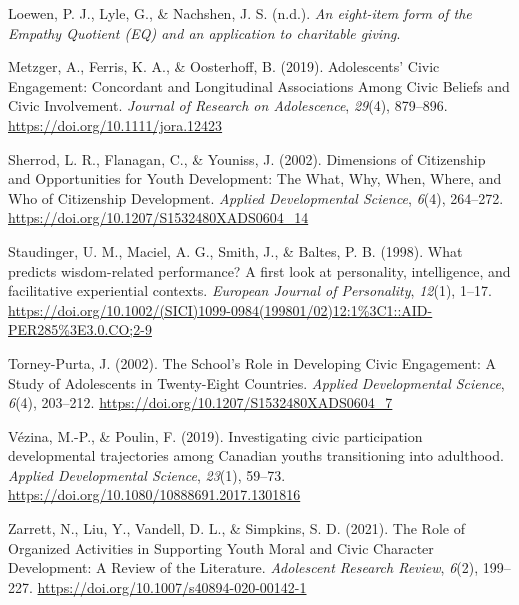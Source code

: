 \documentclass[
  man,
  floatsintext,
  longtable,
  nolmodern,
  notxfonts,
  notimes,
  colorlinks=true,linkcolor=blue,citecolor=blue,urlcolor=blue]{apa7}
\newlength{\cslhangindent}
\newenvironment{CSLReferences}[2] %
 {\begin{list}{}{%
  \setlength{\itemindent}{0pt}
  \setlength{\leftmargin}{0pt}
  \setlength{\parsep}{0pt}
  \ifodd #1
   \setlength{\leftmargin}{\cslhangindent}
   \setlength{\itemindent}{-1\cslhangindent}
  \fi
  \setlength{\itemsep}{#2\baselineskip}}}
 {\end{list}}
\begin{document}
\begin{CSLReferences}{1}{0}
Loewen, P. J., Lyle, G., \& Nachshen, J. S. (n.d.). \emph{An eight-item
form of the {Empathy Quotient} ({EQ}) and an application to charitable
giving}.

Metzger, A., Ferris, K. A., \& Oosterhoff, B. (2019). Adolescents'
{Civic Engagement}: {Concordant} and {Longitudinal Associations Among
Civic Beliefs} and {Civic Involvement}. \emph{Journal of Research on
Adolescence}, \emph{29}(4), 879--896.
\url{https://doi.org/10.1111/jora.12423}

Sherrod, L. R., Flanagan, C., \& Youniss, J. (2002). Dimensions of
{Citizenship} and {Opportunities} for {Youth Development}: {The What},
{Why}, {When}, {Where}, and {Who} of {Citizenship Development}.
\emph{Applied Developmental Science}, \emph{6}(4), 264--272.
\url{https://doi.org/10.1207/S1532480XADS0604_14}

Staudinger, U. M., Maciel, A. G., Smith, J., \& Baltes, P. B. (1998).
What predicts wisdom-related performance? {A} first look at personality,
intelligence, and facilitative experiential contexts. \emph{European
Journal of Personality}, \emph{12}(1), 1--17.
\url{https://doi.org/10.1002/(SICI)1099-0984(199801/02)12:1\%3C1::AID-PER285\%3E3.0.CO;2-9}

Torney-Purta, J. (2002). The {School}'s {Role} in {Developing Civic
Engagement}: {A Study} of {Adolescents} in {Twenty-Eight Countries}.
\emph{Applied Developmental Science}, \emph{6}(4), 203--212.
\url{https://doi.org/10.1207/S1532480XADS0604_7}

Vézina, M.-P., \& Poulin, F. (2019). Investigating civic participation
developmental trajectories among {Canadian} youths transitioning into
adulthood. \emph{Applied Developmental Science}, \emph{23}(1), 59--73.
\url{https://doi.org/10.1080/10888691.2017.1301816}

Zarrett, N., Liu, Y., Vandell, D. L., \& Simpkins, S. D. (2021). The
{Role} of {Organized Activities} in {Supporting Youth Moral} and {Civic
Character Development}: {A Review} of the {Literature}. \emph{Adolescent
Research Review}, \emph{6}(2), 199--227.
\url{https://doi.org/10.1007/s40894-020-00142-1}

\end{CSLReferences}
\end{document}

